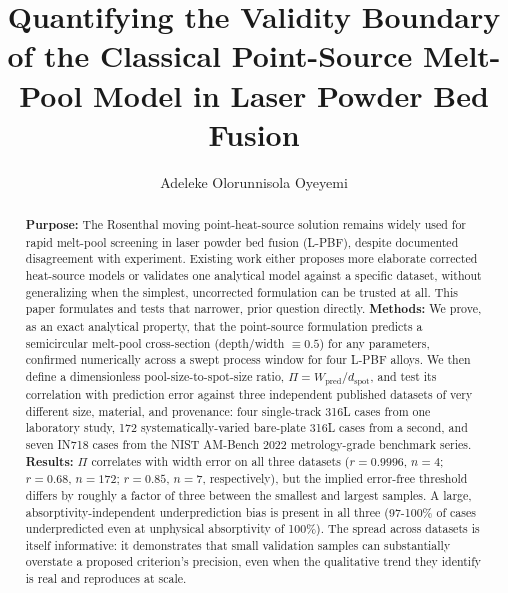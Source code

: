 \documentclass[12pt]{article}
\title{Quantifying the Validity Boundary of the Classical Point-Source Melt-Pool Model in Laser Powder Bed Fusion}
\author[1]{Adeleke Olorunnisola Oyeyemi}
\affil[1]{Department of Mechanical Engineering, Federal University of Technology, Akure, Nigeria}
\date{}
\begin{document}
\maketitle

\begin{abstract}
\noindent\textbf{Purpose:} The Rosenthal moving point-heat-source solution remains widely used for rapid melt-pool screening in laser powder bed fusion (L-PBF), despite documented disagreement with experiment. Existing work either proposes more elaborate corrected heat-source models or validates one analytical model against a specific dataset, without generalizing when the simplest, uncorrected formulation can be trusted at all. This paper formulates and tests that narrower, prior question directly.
\textbf{Methods:} We prove, as an exact analytical property, that the point-source formulation predicts a semicircular melt-pool cross-section (depth/width $\equiv 0.5$) for any parameters, confirmed numerically across a swept process window for four L-PBF alloys. We then define a dimensionless pool-size-to-spot-size ratio, $\Pi = W_{\text{pred}}/d_{\text{spot}}$, and test its correlation with prediction error against three independent published datasets of very different size, material, and provenance: four single-track 316L cases from one laboratory study, 172 systematically-varied bare-plate 316L cases from a second, and seven IN718 cases from the NIST AM-Bench 2022 metrology-grade benchmark series.
\textbf{Results:} $\Pi$ correlates with width error on all three datasets ($r=0.9996$, $n=4$; $r=0.68$, $n=172$; $r=0.85$, $n=7$, respectively), but the implied error-free threshold differs by roughly a factor of three between the smallest and largest samples. A large, absorptivity-independent underprediction bias is present in all three (97-100\% of cases underpredicted even at unphysical absorptivity of 100\%). The spread across datasets is itself informative: it demonstrates that small validation samples can substantially overstate a proposed criterion's precision, even when the qualitative trend they identify is real and reproduces at scale.

\end{abstract}
\end{document}
